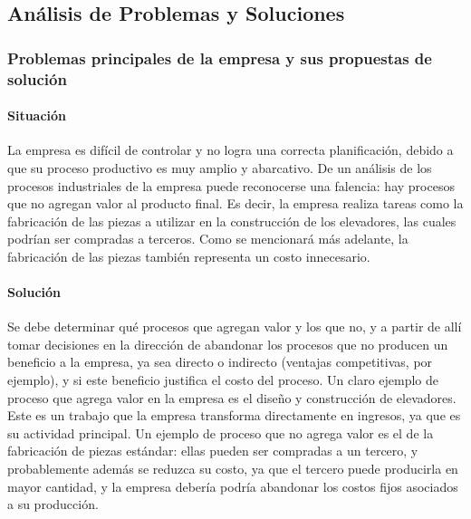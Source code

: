 \documentclass[12pt,a4paper,spanish]{article}
\begin{document}
\subsection{An\'alisis de Problemas y Soluciones}

\subsubsection{Problemas principales de la empresa y sus propuestas de soluci\'on}
\paragraph{Situaci\'on}
La empresa es dif\'icil de controlar y no logra una correcta planificaci\'on, debido a que su proceso productivo es muy amplio y abarcativo. De un an\'alisis de los procesos industriales de la empresa puede reconocerse una falencia: hay procesos que no agregan valor al producto final. Es decir, la empresa realiza tareas como la fabricaci\'on de las piezas a utilizar en la construcci\'on de los elevadores, las cuales podr\'ian ser compradas a terceros. Como se mencionar\'a m\'as adelante, la fabricaci\'on de las piezas tambi\'en representa un costo innecesario.
\paragraph{Soluci\'on}
Se debe determinar qu\'e procesos que agregan valor y los que no, y a partir de all\'i tomar decisiones en la direcci\'on de abandonar los procesos que no producen un beneficio a la empresa, ya sea directo o indirecto (ventajas competitivas, por ejemplo), y si este beneficio justifica el costo del proceso. Un claro ejemplo de proceso que agrega valor en la empresa es el dise\~no y construcci\'on de elevadores. Este es un trabajo que la empresa transforma directamente en ingresos, ya que es su actividad principal. Un ejemplo de proceso que no agrega valor es el de la fabricaci\'on de piezas est\'andar: ellas pueden ser compradas a un tercero, y probablemente adem\'as se reduzca su costo, ya que el tercero puede producirla en mayor cantidad, y la empresa deber\'ia podr\'ia abandonar los costos fijos asociados a su producci\'on.
\end{document}
